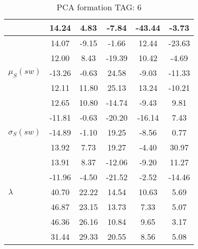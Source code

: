 \begin{table}[h!]
\begin{center}
\begin{tabular}{| l | c | c | c | c | c |}
 & 14.24  & 4.83  & -7.84  & -43.44  & -3.73 \\\hline
 & 14.07  & -9.15  & -1.66  & 12.44  & -23.63 \\\hline
 & 12.00  & 8.43  & -19.39  & 10.42  & -4.69 \\\hline
$\mu_S(sw)$ & -13.26  & -0.63  & 24.58  & -9.03  & -11.33 \\\hline
 & 12.11  & 11.80  & 25.13  & 13.24  & -10.21 \\\hline
 & 12.65  & 10.80  & -14.74  & -9.43  & 9.81 \\\hline
 & -11.81  & -0.63  & -20.20  & -16.14  & 7.43 \\\hline
$\sigma_S(sw)$ & -14.89  & -1.10  & 19.25  & -8.56  & 0.77 \\\hline
 & 13.92  & 7.73  & 19.27  & -4.40  & 30.97 \\\hline
 & 13.91  & 8.37  & -12.06  & -9.20  & 11.27 \\\hline
 & -11.96  & -4.50  & -21.52  & -2.52  & -14.46 \\\hline
$\lambda$ & 40.70  & 22.22  & 14.54  & 10.63  & 5.69 \\\hline
 & 46.87  & 23.15  & 13.73  & 7.33  & 5.07 \\\hline
 & 46.36  & 26.16  & 10.84  & 9.65  & 3.17 \\\hline
 & 31.44  & 29.33  & 20.55  & 8.56  & 5.08 \\\hline
\end{tabular}
\caption{PCA formation TAG: 6}
\end{center}
\end{table}